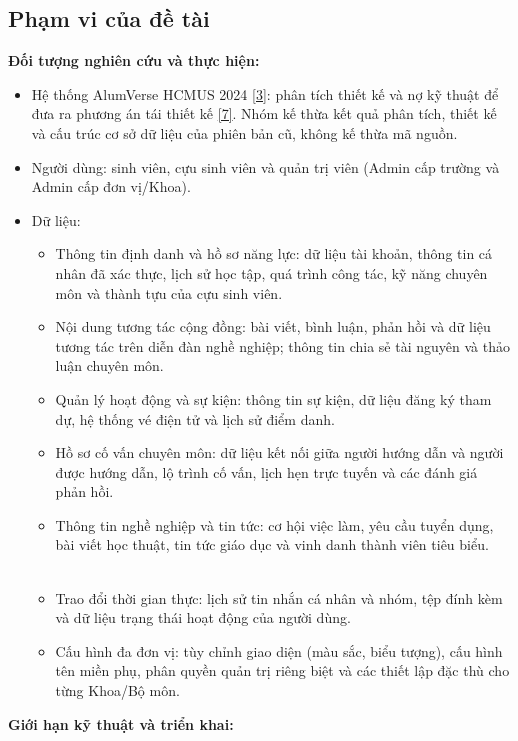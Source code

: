 \documentclass[12pt,a4paper]{article}
\begin{document}
\subsection{Phạm vi của đề tài}
\vspace{-4pt}
\textbf{Đối tượng nghiên cứu và thực hiện:}
\vspace{-4pt}
\begin{itemize}
    \item Hệ thống AlumVerse HCMUS 2024 \hyperref[ref:alumverse]{[3]}: phân tích thiết kế và nợ kỹ thuật để đưa ra phương án tái thiết kế \hyperref[ref:fowler]{[7]}. Nhóm kế thừa kết quả phân tích, thiết kế và cấu trúc cơ sở dữ liệu của phiên bản cũ, không kế thừa mã nguồn.
    \item Người dùng: sinh viên, cựu sinh viên và quản trị viên (Admin cấp trường và Admin cấp đơn vị/Khoa).
    \item Dữ liệu:
    \begin{itemize}
        \item Thông tin định danh và hồ sơ năng lực: dữ liệu tài khoản, thông tin cá nhân đã xác thực, lịch sử học tập, quá trình công tác, kỹ năng chuyên môn và thành tựu của cựu sinh viên.
        \item Nội dung tương tác cộng đồng: bài viết, bình luận, phản hồi và dữ liệu tương tác trên diễn đàn nghề nghiệp; thông tin chia sẻ tài nguyên và thảo luận chuyên môn.
        \item Quản lý hoạt động và sự kiện: thông tin sự kiện, dữ liệu đăng ký tham dự, hệ thống vé điện tử và lịch sử điểm danh.
        \item Hồ sơ cố vấn chuyên môn: dữ liệu kết nối giữa người hướng dẫn và người được hướng dẫn, lộ trình cố vấn, lịch hẹn trực tuyến và các đánh giá phản hồi.
        \item Thông tin nghề nghiệp và tin tức: cơ hội việc làm, yêu cầu tuyển dụng, bài viết học thuật, tin tức giáo dục và vinh danh thành viên tiêu biểu.
        \item Trao đổi thời gian thực: lịch sử tin nhắn cá nhân và nhóm, tệp đính kèm và dữ liệu trạng thái hoạt động của người dùng.
        \item Cấu hình đa đơn vị: tùy chỉnh giao diện (màu sắc, biểu tượng), cấu hình tên miền phụ, phân quyền quản trị riêng biệt và các thiết lập đặc thù cho từng Khoa/Bộ môn.
    \end{itemize}
\end{itemize}
\textbf{Giới hạn kỹ thuật và triển khai:}
\vspace{-4pt}
\end{document}

